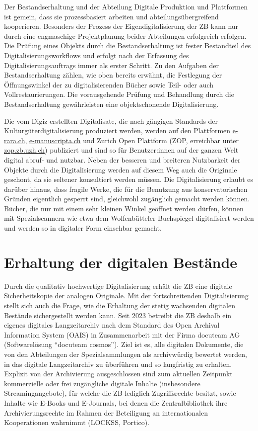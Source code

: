 \documentclass[a4paper,
fontsize=11pt,
oneside,
numbers=noperiodatend,
parskip=half-,
bibliography=totoc,
final
]{scrartcl}
\begin{document}
Der Bestandserhaltung und der Abteilung Digitale Produktion und
Plattformen ist gemein, dass sie prozessbasiert arbeiten und
abteilungsübergreifend kooperieren. Besonders der Prozess der
Eigendigitalisierung der ZB kann nur durch eine engmaschige
Projektplanung beider Abteilungen erfolgreich erfolgen. Die Prüfung
eines Objekts durch die Bestandserhaltung ist fester Bestandteil des
Digitalisierungsworkflows und erfolgt nach der Erfassung des
Digitalisierungsauftrags immer als erster Schritt. Zu den Aufgaben der
Bestandserhaltung zählen, wie oben bereits erwähnt, die Festlegung der
Öffnungswinkel der zu digitalisierenden Bücher sowie Teil- oder auch
Vollrestaurierungen. Die vorausgehende Prüfung und Behandlung durch die
Bestandserhaltung gewährleisten eine objektschonende Digitalisierung.

Die vom Digiz erstellten Digitalisate, die nach gängigen Standards der
Kulturgüterdigitalisierung produziert werden, werden auf den Plattformen
\href{http://www.e-rara.ch/}{e-rara.ch},
\href{http://e-manuscripta.ch}{e-manuscripta.ch} und Zurich Open
Plattform (ZOP, erreichbar unter
\href{http://zop.zb.uzh.ch}{zop.zb.uzh.ch}) publiziert und sind so für
Benutzer:innen auf der ganzen Welt digital abruf- und nutzbar. Neben der
besseren und breiteren Nutzbarkeit der Objekte durch die Digitalisierung
werden auf diesem Weg auch die Originale geschont, da sie seltener
konsultiert werden müssen. Die Digitalisierung erlaubt es darüber
hinaus, dass fragile Werke, die für die Benutzung aus konservatorischen
Gründen eigentlich gesperrt sind, gleichwohl zugänglich gemacht werden
können. Bücher, die nur mit einem sehr kleinen Winkel geöffnet werden
dürfen, können mit Spezialscannern wie etwa dem Wolfenbütteler
Buchspiegel digitalisiert werden und werden so in digitaler Form
einsehbar gemacht.

\section{Erhaltung der digitalen
Bestände}\label{erhaltung-der-digitalen-bestuxe4nde}

Durch die qualitativ hochwertige Digitalisierung erhält die ZB eine
digitale Sicherheitskopie der analogen Originale. Mit der
fortschreitenden Digitalisierung stellt sich auch die Frage, wie die
Erhaltung der stetig wachsenden digitalen Bestände sichergestellt werden
kann. Seit 2023 betreibt die ZB deshalb ein eigenes digitales
Langzeitarchiv nach dem Standard des Open Archival Information System
(OAIS) in Zusammenarbeit mit der Firma docuteam AG (Softwarelösung
\enquote{docuteam cosmos}). Ziel ist es, alle digitalen Dokumente, die
von den Abteilungen der Spezialsammlungen als archivwürdig bewertet
werden, in das digitale Langzeitarchiv zu überführen und so langfristig
zu erhalten. Explizit von der Archivierung ausgeschlossen sind zum
aktuellen Zeitpunkt kommerzielle oder frei zugängliche digitale Inhalte
(insbesondere Streamingangebote), für welche die ZB lediglich
Zugriffsrechte besitzt, sowie Inhalte wie E-Books und E-Journals, bei
denen die Zentralbibliothek ihre Archivierungsrechte im Rahmen der
Beteiligung an internationalen Kooperationen wahrnimmt (LOCKSS,
Portico).
\end{document}

